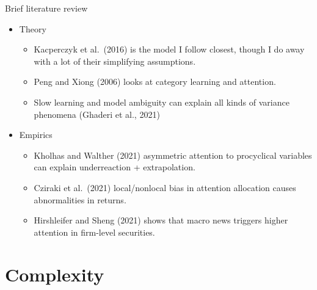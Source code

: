 \documentclass[
  ignorenonframetext,
]{beamer}
\providecommand{\tightlist}{%
  \setlength{\itemsep}{0pt}\setlength{\parskip}{0pt}}
\begin{document}
\begin{frame}{Brief literature review}
\protect\hypertarget{brief-literature-review}{}
\begin{itemize}
\tightlist
\item
  Theory

  \begin{itemize}
  \tightlist
  \item
    Kacperczyk et al.~(2016) is the model I follow closest, though I do
    away with a lot of their simplifying assumptions.
  \item
    Peng and Xiong (2006) looks at category learning and attention.
  \item
    Slow learning and model ambiguity can explain all kinds of variance
    phenomena (Ghaderi et al., 2021)
  \end{itemize}
\item
  Empirics

  \begin{itemize}
  \tightlist
  \item
    Kholhas and Walther (2021) asymmetric attention to procyclical
    variables can explain underreaction + extrapolation.
  \item
    Cziraki et al.~(2021) local/nonlocal bias in attention allocation
    causes abnormalities in returns.
  \item
    Hirshleifer and Sheng (2021) shows that macro news triggers higher
    attention in firm-level securities.
  \end{itemize}
\end{itemize}
\end{frame}

\hypertarget{complexity}{%
\section{Complexity}\label{complexity}}
\end{document}
